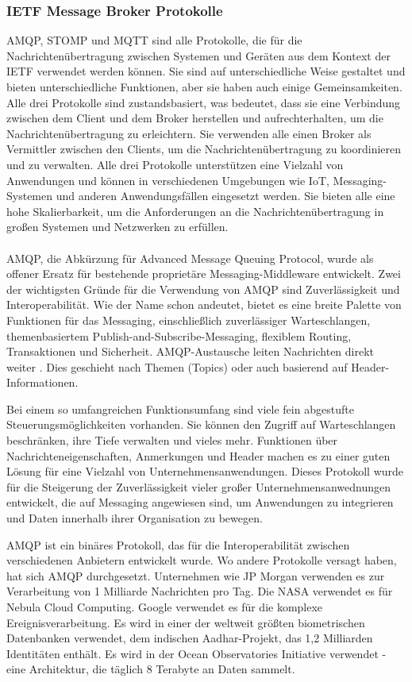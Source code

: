 \subsubsection{IETF Message Broker Protokolle}

AMQP, STOMP und MQTT sind alle Protokolle, die für die Nachrichtenübertragung zwischen Systemen und Geräten aus dem Kontext der IETF verwendet werden können. Sie sind auf unterschiedliche Weise gestaltet und bieten unterschiedliche Funktionen, aber sie haben auch einige Gemeinsamkeiten. Alle drei Protokolle sind zustandsbasiert, was bedeutet, dass sie eine Verbindung zwischen dem Client und dem Broker herstellen und aufrechterhalten, um die Nachrichtenübertragung zu erleichtern. Sie verwenden alle einen Broker als Vermittler zwischen den Clients, um die Nachrichtenübertragung zu koordinieren und zu verwalten.
Alle drei Protokolle unterstützen eine Vielzahl von Anwendungen und können in verschiedenen Umgebungen wie IoT, Messaging-Systemen und anderen Anwendungsfällen eingesetzt werden.
Sie bieten alle eine hohe Skalierbarkeit, um die Anforderungen an die Nachrichtenübertragung in großen Systemen und Netzwerken zu erfüllen. 
\\\\
AMQP, die Abkürzung für Advanced Message Queuing Protocol, wurde als offener Ersatz für bestehende proprietäre Messaging-Middleware entwickelt. Zwei der wichtigsten Gründe für die Verwendung von AMQP sind Zuverlässigkeit und Interoperabilität. Wie der Name schon andeutet, bietet es eine breite Palette von Funktionen für das Messaging, einschließlich zuverlässiger Warteschlangen, themenbasiertem Publish-and-Subscribe-Messaging, flexiblem Routing, Transaktionen und Sicherheit. AMQP-Austausche leiten Nachrichten direkt weiter . Dies geschieht nach Themen (Topics) oder auch basierend auf Header-Informationen.

Bei einem so umfangreichen Funktionsumfang sind viele fein abgestufte Steuerungsmöglichkeiten vorhanden. Sie können den Zugriff auf Warteschlangen beschränken, ihre Tiefe verwalten und vieles mehr. Funktionen über Nachrichteneigenschaften, Anmerkungen und Header machen es zu einer guten Lösung für eine Vielzahl von Unternehmensanwendungen. Dieses Protokoll wurde für die Steigerung der Zuverlässigkeit vieler großer Unternehmensanwednungen entwickelt, die auf Messaging angewiesen sind, um Anwendungen zu integrieren und Daten innerhalb ihrer Organisation zu bewegen. 

AMQP ist ein binäres Protokoll, das für die Interoperabilität zwischen verschiedenen Anbietern entwickelt wurde. Wo andere Protokolle versagt haben, hat sich AMQP durchgesetzt. Unternehmen wie JP Morgan verwenden es zur Verarbeitung von 1 Milliarde Nachrichten pro Tag. Die NASA verwendet es für Nebula Cloud Computing. Google verwendet es für die komplexe Ereignisverarbeitung. Es wird in einer der weltweit größten biometrischen Datenbanken verwendet, dem indischen Aadhar-Projekt, das 1,2 Milliarden Identitäten enthält. Es wird in der Ocean Observatories Initiative verwendet - eine Architektur, die täglich 8 Terabyte an Daten sammelt. 

